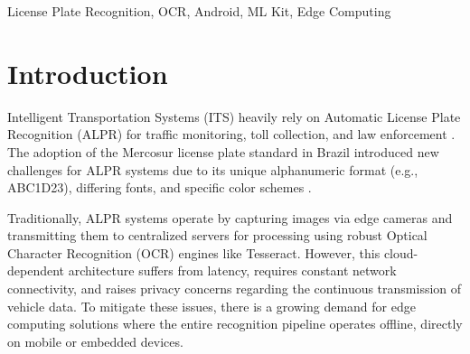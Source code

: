 \documentclass[conference]{IEEEtran}
\begin{document}
\begin{abstract}
License Plate Recognition (LPR) systems are essential for intelligent transportation and security. While desktop-based solutions leveraging Optical Character Recognition (OCR) engines like Tesseract have been widely studied, mobile and offline scenarios introduce significant constraints. This paper proposes and empirically evaluates a fully offline LPR pipeline for Brazilian Mercosur license plates executing natively on Android devices. We implemented an application using YOLOv8 for vehicle and plate detection, integrated with Google's ML Kit for on-device text recognition. We benchmarked this pipeline against a desktop baseline that utilized Tesseract OCR. Our results show that the on-device ML Kit approach achieved a global full-plate accuracy of 11.2\%, significantly outperforming the 3.1\% baseline of the desktop Tesseract system. Furthermore, we investigated the impact of eight distinct image preprocessing techniques and confidence thresholds. Interestingly, while Tesseract heavily relied on image resizing, the ML Kit OCR performed optimally on the original, unmodified image crops. This research highlights the viability of deploying offline LPR systems on edge devices and discusses the remaining challenges in achieving near-perfect recognition for the Mercosur plate standard.
\end{abstract}

\begin{IEEEkeywords}
License Plate Recognition, OCR, Android, ML Kit, Edge Computing
\end{IEEEkeywords}

\section{Introduction}
Intelligent Transportation Systems (ITS) heavily rely on Automatic License Plate Recognition (ALPR) for traffic monitoring, toll collection, and law enforcement \cite{du2013automatic}. The adoption of the Mercosur license plate standard in Brazil introduced new challenges for ALPR systems due to its unique alphanumeric format (e.g., ABC1D23), differing fonts, and specific color schemes \cite{goncalves2019mercosur}.

Traditionally, ALPR systems operate by capturing images via edge cameras and transmitting them to centralized servers for processing using robust Optical Character Recognition (OCR) engines like Tesseract. However, this cloud-dependent architecture suffers from latency, requires constant network connectivity, and raises privacy concerns regarding the continuous transmission of vehicle data. To mitigate these issues, there is a growing demand for edge computing solutions \cite{satyanarayanan2017edge} where the entire recognition pipeline operates offline, directly on mobile or embedded devices.
\end{document}
